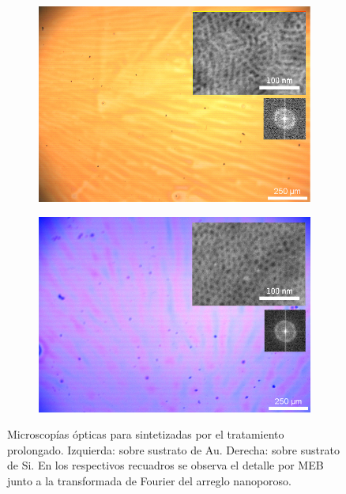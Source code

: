 			 \begin{figure}
		 	   	    \begin{subfigure}{0.495\textwidth}
			       	\includegraphics[width=\textwidth]{Imagenes/Au_130F127-Combinada.jpg}
			   		\end{subfigure}
			   		\begin{subfigure}{0.495\textwidth}
			   	    \includegraphics[width=\textwidth]{Imagenes/Si_130F127-Combinada.jpg}
			   		\end{subfigure}
					 \caption[Microscopía \pdmF\space tratamiento prolongado.]{Microscopías ópticas para \pdmF\space sintetizadas por el tratamiento prolongado. Izquierda: sobre sustrato de Au. Derecha: sobre sustrato de Si. En los respectivos recuadros se observa el detalle por MEB junto a la transformada de Fourier del arreglo nanoporoso.}
					 \label{fig:Microscopia_F127_prolongado}	
				     \end{figure}	

